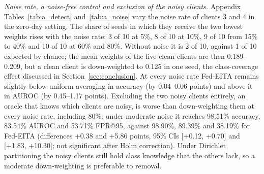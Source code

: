 \documentclass[pdflatex,sn-mathphys-num]{sn-jnl}
\newcommand{\Rtwo}{\color{blue}}
\begin{document}
{{{\Rtwo \emph{Noise rate, a noise-free control and exclusion of the noisy clients.} Appendix Tables~\ref{tab:a_detect} and~\ref{tab:a_noise} vary the noise rate of clients 3 and 4 in the zero-day setting. The share of seeds in which they receive the two lowest weights rises with the noise rate: 3 of 10 at 5\%, 8 of 10 at 10\%, 9 of 10 from 15\% to 40\% and 10 of 10 at 60\% and 80\%. Without noise it is 2 of 10, against 1 of 10 expected by chance; the mean weights of the five clean clients are then 0.189--0.209, but a clean client is down-weighted to 0.125 in one seed, the class-coverage effect discussed in Section~\ref{sec:conclusion}. At every noise rate Fed-EITA remains slightly below uniform averaging in accuracy (by 0.04--0.06 points) and above it in AUROC (by 0.45--1.17 points). Excluding the two noisy clients entirely, an oracle that knows which clients are noisy, is worse than down-weighting them at every noise rate, including 80\%: under moderate noise it reaches 98.51\% accuracy, 83.54\% AUROC and 53.71\% FPR@95, against 98.90\%, 89.39\% and 38.19\% for Fed-EITA (differences +0.38 and +5.86 points, 95\% CIs [+0.12, +0.70] and [+1.83, +10.30]; not significant after Holm correction). Under Dirichlet partitioning the noisy clients still hold class knowledge that the others lack, so a moderate down-weighting is preferable to removal.}




}}
\end{document}
